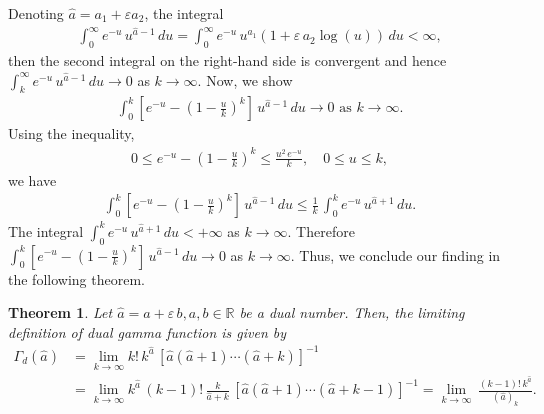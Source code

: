 \documentclass[11pt,a4paper,fleqn]{article}
\newtheorem{theorem}{Theorem}
\numberwithin{equation}{section}
\numberwithin{lemma}{section}
\numberwithin{theorem}{section}
\numberwithin{corollary}{section}
\begin{document}
Denoting $\widehat{a} = a_1 + \varepsilon a_2$, the integral 
\begin{align}
	\int_{0}^{\infty} e^{-u} \, u^{\widehat{a} - 1} \, du = \int_{0}^{\infty} e^{-u} \, u^{a_1} \left(1 + \varepsilon \, a_2 \log (u)\right) \, du < \infty,
\end{align}
then the second integral on the right-hand side is convergent and hence $\int_{k}^{\infty} e^{-u} \, u^{\widehat{a} - 1} \, du \to 0$ as $k \to \infty$. Now, we show 
\begin{align*}
	\int_{0}^{k} \left[e^{-u} - \left(1 - \frac{u}{k}\right)^k \right] \, u^{\widehat{a} - 1} \, du \to 0 \text{ as } k \to \infty.
\end{align*}
Using the inequality, \cite{edr}
\begin{align}
	0 \le e^{-u} - \left(1 - \frac{u}{k}\right)^k \le \frac{u^2 \, e^{-u}}{k}, \quad 0 \le u \le k,
\end{align}
we have
\begin{align*}
	\int_{0}^{k} \left[e^{-u} - \left(1 - \frac{u}{k}\right)^k \right] \, u^{\widehat{a} - 1} \, du \le \frac{1}{k} \, \int_{0}^{k} e^{-u} \, u^{\widehat{a} + 1}  \, du.
\end{align*}
The integral $\int_{0}^{k} e^{-u} \, u^{\widehat{a} + 1}  \, du < + \infty$ as $k \to \infty$. Therefore $\int_{0}^{k} \left[e^{-u} - \left(1 - \frac{u}{k}\right)^k \right] \, u^{\widehat{a} - 1} \, du \to 0$ as $k \to \infty$. Thus, we conclude our finding in the following theorem. 
\begin{theorem}
	Let $\widehat{a} = a + \varepsilon \, b, a, b \in \mathbb{R}$ be a dual number. Then, the limiting definition of dual gamma function is given by
	\begin{align}
		\Gamma_d (\widehat{a}) & = \lim_{k \to \infty} k ! \, k^{\widehat{a}} \, \left[\widehat{a} (\widehat{a} + 1) \cdots (\widehat{a} + k)\right]^{-1}\nonumber\\
		& = \lim_{k \to \infty} k^{\widehat{a}} \, (k - 1) ! \, \frac{k}{\widehat{a} + k} \, [\widehat{a} (\widehat{a} + 1) \cdots (\widehat{a} + k - 1)]^{-1}  = \lim_{k \to \infty} \, \frac{(k - 1) ! \, k^{\widehat{a}}}{(\widehat{a})_k}. 
	\end{align}
\end{theorem}
\end{document}
